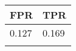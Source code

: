 \begin{tabular}{ll}
\hline
 FPR   & TPR   \\
\hline
 0.127 & 0.169 \\
       &       \\
\hline
\end{tabular}